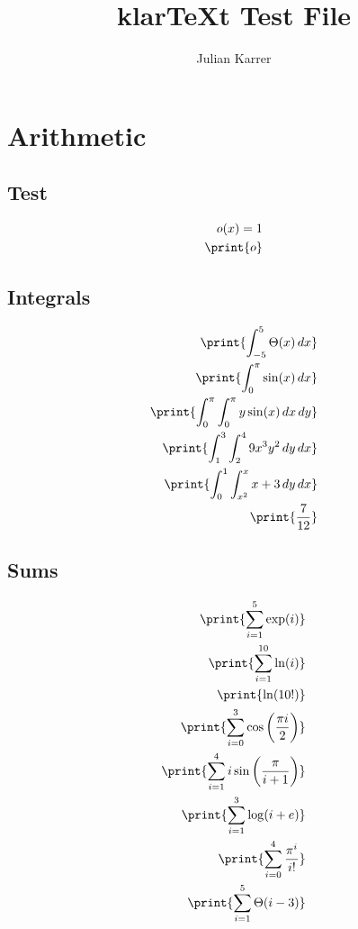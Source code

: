 \documentclass[oneside, a4paper]{article}
\author{Julian Karrer}
\title{klarTeXt Test File}
\begin{document}
\maketitle

\section*{Arithmetic}

\subsection*{Test}
\begin{program}
\begin{align*}
    o(x)=1\\
    \print{o}\\
\end{align*}
\end{program}


\subsection*{Integrals}
\begin{program}
\begin{align*}
    \print{\int_{-5}^5 \Theta(x) \, dx}\\
    \print{\int_0^\pi \sin(x) \, dx}\\
    \print{\int_0^\pi\int_{0}^{\pi} y\sin(x) \, dx\, dy}\\
    \print{\int_1^3\int_2^4 9x^3y^2 \, dy\, dx}\\
    \print{\int_0^1\int_{x^2}^x x+3 \, dy\, dx}\\
    \print{\frac{7}{12}}\\
\end{align*}
\end{program}

\subsection*{Sums}
\begin{program}
\begin{align*}
    \print{\sum_{i=1}^5 \exp(i)}\\
    \print{\sum_{i=1}^{10} \ln(i)}\\
    \print{\ln(10!)}\\
    \print{\sum_{i=0}^{3}\cos\left(\frac{\pi i}{2}\right)}\\
    \print{\sum_{i=1}^{4} i\sin\left(\frac{\pi}{i+1}\right)}\\
    \print{\sum_{i=1}^{3} \log(i+e)}\\
    \print{\sum_{i=0}^{4} \frac{\pi^i}{i!}}\\
    \print{\sum_{i=1}^{5} \Theta(i-3)}\\
\end{align*}
\end{program}
\end{document}
